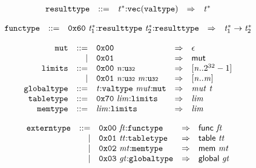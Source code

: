$$
\begin{array}{@{}l@{}rrlll@{}l@{}}
& {\mathtt{resulttype}} &::=& {{\mathit{t}}^\ast}{:}{\mathtt{vec}}({\mathtt{valtype}}) &\Rightarrow& {{\mathit{t}}^\ast} \\
\end{array}
$$

\vspace{1ex}

$$
\begin{array}{@{}l@{}rrlll@{}l@{}}
& {\mathtt{functype}} &::=& \mathtt{0x60}~{{\mathit{t}}_{{1}}^\ast}{:}{\mathtt{resulttype}}~{{\mathit{t}}_{{2}}^\ast}{:}{\mathtt{resulttype}} &\Rightarrow& {{\mathit{t}}_{{1}}^\ast} \rightarrow {{\mathit{t}}_{{2}}^\ast} \\
\end{array}
$$

\vspace{1ex}

$$
\begin{array}{@{}l@{}rrlll@{}l@{}}
& {\mathtt{mut}} &::=& \mathtt{0x00} &\Rightarrow& \epsilon \\ &&|&
\mathtt{0x01} &\Rightarrow& \mathsf{mut} \\
& {\mathtt{limits}} &::=& \mathtt{0x00}~{\mathit{n}}{:}{\mathtt{u{\scriptstyle32}}} &\Rightarrow& [{\mathit{n}} .. {2^{32}} - 1] \\ &&|&
\mathtt{0x01}~{\mathit{n}}{:}{\mathtt{u{\scriptstyle32}}}~{\mathit{m}}{:}{\mathtt{u{\scriptstyle32}}} &\Rightarrow& [{\mathit{n}} .. {\mathit{m}}] \\
& {\mathtt{globaltype}} &::=& {\mathit{t}}{:}{\mathtt{valtype}}~{\mathit{mut}}{:}{\mathtt{mut}} &\Rightarrow& {\mathit{mut}}~{\mathit{t}} \\
& {\mathtt{tabletype}} &::=& \mathtt{0x70}~{\mathit{lim}}{:}{\mathtt{limits}} &\Rightarrow& {\mathit{lim}} \\
& {\mathtt{memtype}} &::=& {\mathit{lim}}{:}{\mathtt{limits}} &\Rightarrow& {\mathit{lim}} \\
\end{array}
$$

\vspace{1ex}

$$
\begin{array}{@{}l@{}rrlll@{}l@{}}
& {\mathtt{externtype}} &::=& \mathtt{0x00}~{\mathit{ft}}{:}{\mathtt{functype}} &\Rightarrow& \mathsf{func}~{\mathit{ft}} \\ &&|&
\mathtt{0x01}~{\mathit{tt}}{:}{\mathtt{tabletype}} &\Rightarrow& \mathsf{table}~{\mathit{tt}} \\ &&|&
\mathtt{0x02}~{\mathit{mt}}{:}{\mathtt{memtype}} &\Rightarrow& \mathsf{mem}~{\mathit{mt}} \\ &&|&
\mathtt{0x03}~{\mathit{gt}}{:}{\mathtt{globaltype}} &\Rightarrow& \mathsf{global}~{\mathit{gt}} \\
\end{array}
$$

